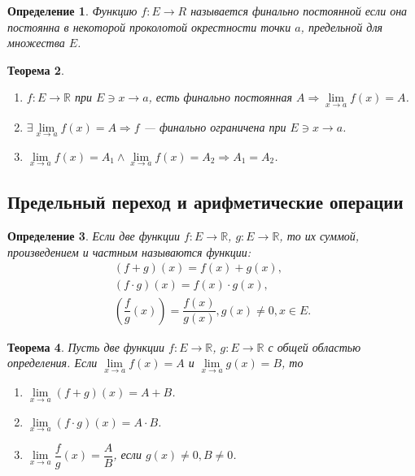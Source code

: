 \documentclass[12pt]{report}
\theoremstyle{plain}
\newtheorem{theorem}{Теорема}[chapter]
\newtheorem{definition}[theorem]{Определение}
\newcommand{\R}{\mathbb R}
\begin{document}
\begin{definition}
  Функцию $f: E \rightarrow R$ называется финально постоянной если она постоянна в некоторой
  проколотой окрестности точки $a$, предельной для множества $E$.
\end{definition}

\begin{theorem}
  \begin{enumerate}
    \item $f: E \rightarrow \R$ при $E \ni x \rightarrow a$, есть финально постоянная
      $A \Rightarrow \lim\limits_{x\rightarrow a} f(x) = A$.
    \item $\exists \lim\limits_{x\rightarrow a} f(x) = A \Rightarrow f$ --- финально ограничена при $E \ni x \rightarrow a$.
    \item $\lim\limits_{x\rightarrow a} f(x) = A_1 \land \lim\limits_{x\rightarrow a} f(x) = A_2 \Rightarrow A_1 = A_2$.
  \end{enumerate}
\end{theorem}

\subsection{Предельный переход и арифметические операции}
\begin{definition}
  Если две функции $f: E \rightarrow \R$, $g: E \rightarrow \R$, то их суммой, произведением и частным
  называются функции:
  \begin{gather*}
    (f + g)(x) = f(x) + g(x), \\
    (f \cdot g)(x) = f(x) \cdot g(x), \\
    \left(\dfrac{f}{g}(x)\right) = \dfrac{f(x)}{g(x)}, g(x) \ne 0, x \in E.
  \end{gather*}
\end{definition}

\begin{theorem}
  Пусть две функции $f: E \rightarrow \R$, $g: E \rightarrow \R$ с общей областью определения.
  Если $\lim\limits_{x\rightarrow a} f(x) = A$ и $\lim\limits_{x\rightarrow a} g(x) = B$, то
  \begin{enumerate}
    \item $\lim\limits_{x\rightarrow a} (f + g)(x) = A + B$.
    \item $\lim\limits_{x\rightarrow a} (f \cdot g)(x) = A \cdot B$.
    \item $\lim\limits_{x\rightarrow a} \dfrac{f}{g}(x) = \dfrac{A}{B}$, если $g(x) \ne 0, B \ne 0$.
  \end{enumerate}
\end{theorem}
\end{document}
